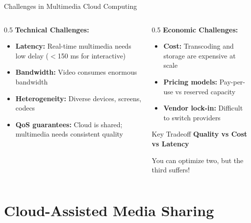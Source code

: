 \documentclass[aspectratio=169,12pt]{beamer}
\begin{document}
\begin{frame}{Challenges in Multimedia Cloud Computing}
    \begin{columns}
        \begin{column}{0.5\textwidth}
            \textbf{Technical Challenges:}
            \begin{itemize}
                \item \textbf{Latency:} Real-time multimedia needs low delay ($<$150 ms for interactive)
                \item \textbf{Bandwidth:} Video consumes enormous bandwidth
                \item \textbf{Heterogeneity:} Diverse devices, screens, codecs
                \item \textbf{QoS guarantees:} Cloud is shared; multimedia needs consistent quality
            \end{itemize}
        \end{column}
        \begin{column}{0.5\textwidth}
            \textbf{Economic Challenges:}
            \begin{itemize}
                \item \textbf{Cost:} Transcoding and storage are expensive at scale
                \item \textbf{Pricing models:} Pay-per-use vs reserved capacity
                \item \textbf{Vendor lock-in:} Difficult to switch providers
            \end{itemize}
            
            \vspace{0.3cm}
            \begin{block}{Key Tradeoff}
                \textbf{Quality vs Cost vs Latency}
                
                You can optimize two, but the third suffers!
            \end{block}
        \end{column}
    \end{columns}
\end{frame}


\section{Cloud-Assisted Media Sharing}
\end{document}
